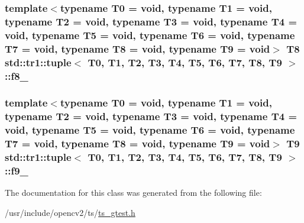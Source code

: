\hypertarget{classstd_1_1tr1_1_1tuple_a335bd9d920b8aff1e2a47980bbf274db}{
\subsubsection[{f8\-\_\-}]{\setlength{\rightskip}{0pt plus 5cm}template$<$typename T0 = void, typename T1 = void, typename T2 = void, typename T3 = void, typename T4 = void, typename T5 = void, typename T6 = void, typename T7 = void, typename T8 = void, typename T9 = void$>$ T8 {\bf std\-::tr1\-::tuple}$<$ T0, T1, T2, T3, T4, T5, T6, T7, T8, T9 $>$\-::f8\-\_\-}}\label{classstd_1_1tr1_1_1tuple_a335bd9d920b8aff1e2a47980bbf274db}
\hypertarget{classstd_1_1tr1_1_1tuple_a1b8a389f9e3974be4130f6ba2fbe5234}{
\subsubsection[{f9\-\_\-}]{\setlength{\rightskip}{0pt plus 5cm}template$<$typename T0 = void, typename T1 = void, typename T2 = void, typename T3 = void, typename T4 = void, typename T5 = void, typename T6 = void, typename T7 = void, typename T8 = void, typename T9 = void$>$ T9 {\bf std\-::tr1\-::tuple}$<$ T0, T1, T2, T3, T4, T5, T6, T7, T8, T9 $>$\-::f9\-\_\-}}\label{classstd_1_1tr1_1_1tuple_a1b8a389f9e3974be4130f6ba2fbe5234}


The documentation for this class was generated from the following file\-:\begin{DoxyCompactItemize}
\item 
/usr/include/opencv2/ts/\hyperlink{ts__gtest_8h}{ts\-\_\-gtest.\-h}\end{DoxyCompactItemize}
